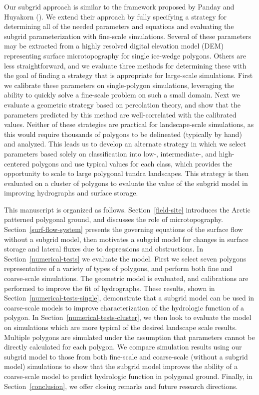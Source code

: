 \documentclass[review,11pt]{elsarticle}
\begin{document}
Our subgrid approach is similar to the framework proposed by Panday and Huyakorn (\citeyear{panday2004fully}). We extend their approach by fully specifying a strategy for determining all of the needed parameters and equations and evaluating the subgrid parameterization with fine-scale simulations.
Several of these parameters may be extracted from a highly resolved digital elevation model (DEM) representing surface microtopography for single ice-wedge polygons.
Others are less straightforward, and we evaluate three methods for determining these with the goal of finding a strategy that is appropriate for large-scale simulations.
First we calibrate these parameters on single-polygon simulations, leveraging the ability to quickly solve a fine-scale problem on such a small domain.
Next we evaluate a geometric strategy based on percolation theory, and show that the parameters predicted by this method are well-correlated with the calibrated values.
Neither of these strategies are practical for landscape-scale simulations, as this would require thousands of polygons to be delineated (typically by hand) and analyzed.
This leads us to develop an alternate strategy in which we select parameters based solely on classification into low-, intermediate-, and high-centered polygons and use typical values for each class, which provides the opportunity to scale to large polygonal tundra landscapes.
This strategy is then evaluated on a cluster of polygons to evaluate the value of the subgrid model in improving hydrographs and surface storage.

This manuscript is organized as follows. 
Section~\ref{field-site} introduces the Arctic patterned polygonal ground, and discusses the role of microtopography. 
Section~\ref{surf-flow-system} presents the governing equations of the surface flow without a subgrid model, then motivates a subgrid model for changes in surface storage and lateral fluxes due to depressions and obstructions. 
In Section~\ref{numerical-tests} we evaluate the model.  
First we select seven polygons representative of a variety of types of polygons, and perform both fine and coarse-scale simulations.
The geometric model is evaluated, and calibrations are performed to improve the fit of hydrographs.
These results, shown in Section~\ref{numerical-tests-single}, demonstrate that a subgrid model can be used in coarse-scale models to improve characterization of the hydrologic function of a polygon.
In Section~\ref{numerical-tests-cluster}, we then look to evaluate the model on simulations which are more typical of the desired landscape scale results.  
Multiple polygons are simulated under the assumption that parameters cannot be directly calculated for each polygon.
We compare simulation results using our subgrid model to those from both fine-scale and coarse-scale (without a subgrid model) simulations to show that the subgrid model improves the ability of a coarse-scale model to predict hydrologic function in polygonal ground. 
Finally, in Section~\ref{conclusion}, we offer closing remarks and future research directions. 
\end{document}
